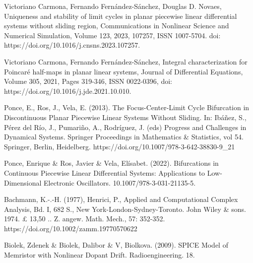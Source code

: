 \documentclass[12pt,a4paper]{report} %
\begin{document}
\begin{thebibliography}{99}
		 Victoriano Carmona, Fernando Fernández-Sánchez, Douglas D. Novaes,
		Uniqueness and stability of limit cycles in planar piecewise linear differential systems without sliding region,
		Communications in Nonlinear Science and Numerical Simulation,
		Volume 123, 2023, 107257, ISSN 1007-5704.
		doi: https://doi.org/10.1016/j.cnsns.2023.107257.
		
		 Victoriano Carmona, Fernando Fernández-Sánchez,
		Integral characterization for Poincaré half-maps in planar linear systems, Journal of Differential Equations, Volume 305, 2021, Pages 319-346, ISSN 0022-0396, doi: https://doi.org/10.1016/j.jde.2021.10.010.
		
		 Ponce, E., Ros, J., Vela, E. (2013). The Focus-Center-Limit Cycle Bifurcation in Discontinuous Planar Piecewise Linear Systems Without Sliding. In: Ibáñez, S., Pérez del Río, J., Pumariño, A., Rodríguez, J. (eds) Progress and Challenges in Dynamical Systems. Springer Proceedings in Mathematics \& Statistics, vol 54. Springer, Berlin, Heidelberg. https://doi.org/10.1007/978-3-642-38830-9\_21
		
		 Ponce, Enrique \& Ros, Javier \& Vela, Elísabet. (2022). Bifurcations in Continuous Piecewise Linear Differential Systems: Applications to Low-Dimensional Electronic Oscillators. 10.1007/978-3-031-21135-5. 
		
		 Bachmann, K.-.-H. (1977), Henrici, P., Applied and Computational Complex Analysis, Bd. I, 682 S., New York-London-Sydney-Toronto. John Wiley \& sons. 1974. £ 13,50 .. Z. angew. Math. Mech., 57: 352-352. https://doi.org/10.1002/zamm.19770570622
		
		 Biolek, Zdenek \& Biolek, Dalibor \& V, Biolkova. (2009). SPICE Model of Memristor with Nonlinear Dopant Drift. Radioengineering. 18. 
		
	\end{thebibliography}
	
	\newpage
	
\end{document}
